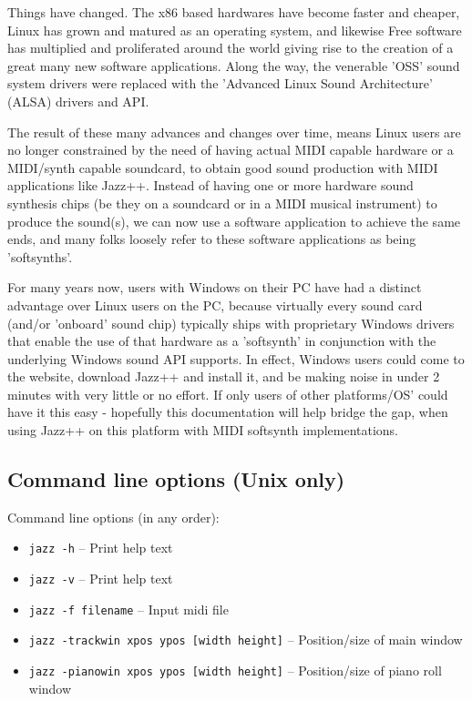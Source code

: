 \documentclass[letterpaper]{report}
\begin{document}
Things have changed. The x86 based hardwares have become faster and
cheaper, Linux has grown and matured as an operating system, and
likewise Free software has multiplied and proliferated around the world
giving rise to the creation of a great many new software applications.
Along the way, the venerable 'OSS' sound system drivers were replaced
with the 'Advanced Linux Sound Architecture' (ALSA) drivers and API.

The result of these many advances and changes over time, means Linux
users are no longer constrained by the need of having actual MIDI
capable hardware or a MIDI/synth capable soundcard, to obtain good sound
production with MIDI applications like Jazz++. Instead of having one
or more hardware sound synthesis chips (be they on a soundcard or
in a MIDI musical instrument) to produce the sound(s), we can now
use a software application to achieve the same ends, and many folks
loosely refer to these software applications as being 'softsynths'.

For many years now, users with Windows on their PC have had a distinct
advantage over Linux users on the PC, because virtually every sound
card (and/or 'onboard' sound chip) typically ships with proprietary
Windows drivers that enable the use of that hardware as a 'softsynth' in
conjunction with the underlying Windows sound API supports. In effect,
Windows users could come to the website, download Jazz++ and install it,
and be making noise in under 2 minutes with very little or no effort. If
only users of other platforms/OS' could have it this easy - hopefully
this documentation will help bridge the gap, when using Jazz++ on this
platform with MIDI softsynth implementations.



\subsection{Command line options (Unix only)}

Command line options (in any order):

\begin{itemize}
\item {\tt jazz -h}                                   -- Print help text
\item {\tt jazz -v}                                   -- Print help text
\item {\tt jazz -f filename}                          -- Input midi file
\item {\tt jazz -trackwin xpos ypos [width height]}   -- Position/size of main
window
\item {\tt jazz -pianowin xpos ypos [width height]}   -- Position/size of piano
roll window
\end{itemize}
\end{document}
